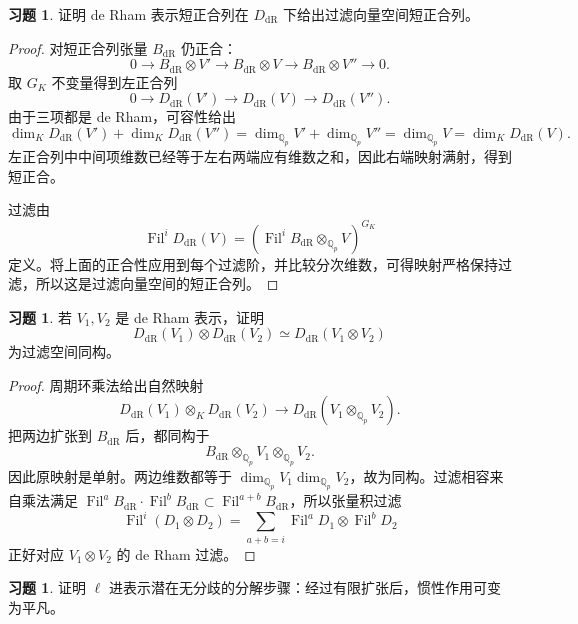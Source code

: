 \documentclass[11pt,a4paper,openany]{ctexbook}
\numberwithin{equation}{chapter}
\newcommand{\Q}{\mathbb{Q}}
\newcommand{\Fil}{\operatorname{Fil}}
\theoremstyle{plain}
\theoremstyle{definition}
\newtheorem{exercise}[theorem]{习题}
\theoremstyle{remark}
\begin{document}
\begin{exercise}
证明 de Rham 表示短正合列在 $D_{\mathrm{dR}}$ 下给出过滤向量空间短正合列。
\end{exercise}

\begin{proof}
对短正合列张量 $B_{\mathrm{dR}}$ 仍正合：
\[
0\to B_{\mathrm{dR}}\otimes V'\to
B_{\mathrm{dR}}\otimes V\to
B_{\mathrm{dR}}\otimes V''\to0.
\]
取 $G_K$ 不变量得到左正合列
\[
0\to D_{\mathrm{dR}}(V')\to D_{\mathrm{dR}}(V)\to D_{\mathrm{dR}}(V'').
\]
由于三项都是 de Rham，可容性给出
\[
\dim_KD_{\mathrm{dR}}(V')+\dim_KD_{\mathrm{dR}}(V'')
=\dim_{\Q_p}V'+\dim_{\Q_p}V''
=\dim_{\Q_p}V
=\dim_KD_{\mathrm{dR}}(V).
\]
左正合列中中间项维数已经等于左右两端应有维数之和，因此右端映射满射，得到短正合。

过滤由
\[
  \Fil^iD_{\mathrm{dR}}(V)=
  ( \Fil^iB_{\mathrm{dR}}\otimes_{\Q_p}V)^{G_K}
\]
定义。将上面的正合性应用到每个过滤阶，并比较分次维数，可得映射严格保持过滤，所以这是过滤向量空间的短正合列。
\end{proof}

\begin{exercise}
若 $V_1,V_2$ 是 de Rham 表示，证明
\[
  D_{\mathrm{dR}}(V_1)\otimes D_{\mathrm{dR}}(V_2)\simeq D_{\mathrm{dR}}(V_1\otimes V_2)
\]
为过滤空间同构。
\end{exercise}

\begin{proof}
周期环乘法给出自然映射
\[
  D_{\mathrm{dR}}(V_1)\otimes_KD_{\mathrm{dR}}(V_2)
  \longrightarrow D_{\mathrm{dR}}(V_1\otimes_{\Q_p}V_2).
\]
把两边扩张到 $B_{\mathrm{dR}}$ 后，都同构于
\[
  B_{\mathrm{dR}}\otimes_{\Q_p}V_1\otimes_{\Q_p}V_2.
\]
因此原映射是单射。两边维数都等于 $\dim_{\Q_p}V_1\dim_{\Q_p}V_2$，故为同构。过滤相容来自乘法满足 $\Fil^aB_{\mathrm{dR}}\cdot\Fil^bB_{\mathrm{dR}}\subset\Fil^{a+b}B_{\mathrm{dR}}$，所以张量积过滤
\[
  \Fil^i(D_1\otimes D_2)=\sum_{a+b=i}\Fil^aD_1\otimes\Fil^bD_2
\]
正好对应 $V_1\otimes V_2$ 的 de Rham 过滤。
\end{proof}

\begin{exercise}
证明 $\ell$ 进表示潜在无分歧的分解步骤：经过有限扩张后，惯性作用可变为平凡。
\end{exercise}
\end{document}
